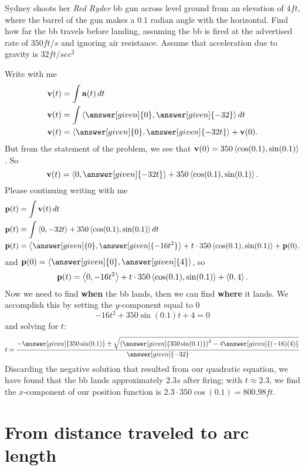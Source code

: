\documentclass{ximera}
\begin{document}
\begin{example}
Sydney shoots her \textit{Red Ryder} bb gun across level ground from
an elevation of $4\unit{ft}$, where the barrel of the gun makes a
$0.1$ radian angle with the horizontal. Find how far the bb travels
before landing, assuming the bb is fired at the advertised rate of
$350\unit{ft/s}$ and ignoring air resistance. Assume that acceleration
due to gravity is $32\unit{ft/sec^2}$
\begin{explanation}
  Write with me
  \begin{align*}
    \vec{v}(t) &= \int \vec{a}(t) \d t\\
    \vec{v}(t) &= \int \vector{\answer[given]{0},\answer[given]{-32}} \d t\\
    \vec{v}(t) &= \vector{\answer[given]{0},\answer[given]{-32t}} + \vec{v}(0).
  \end{align*}
  But from the statement of the problem, we see that $\mathbf{v}(0) =
  350\left\langle \cos(0.1),\sin(0.1)\right\rangle$. So
  \[
  \vec{v}(t) = \vector{0,\answer[given]{-32t}}+ 350\vector{\cos(0.1),\sin(0.1)}.
  \]
  Please continuing writing with me
  \begin{align*}
    \vec{p}(t) &= \int \vec{v}(t)\d t \\
    \vec{p}(t) &= \int \vector{0,-32t} + 350\vector{\cos(0.1),\sin(0.1)}\d t\\
    \vec{p}(t) &= \vector{\answer[given]{0},\answer[given]{-16t^2}} +t\cdot 350\vector{\cos(0.1),\sin(0.1)}+ \vec{p}(0).
  \end{align*}
  and $\vec{p}(0) = \vector{\answer[given]{0},\answer[given]{4}}$, so
  \[
  \mathbf{p}(t) = \left\langle 0,-16t^2\right\rangle +t\cdot 350\left\langle \cos(0.1),\sin(0.1)\right\rangle+ \left\langle 0,4\right\rangle.
  \]
  Now we need to find \textbf{when} the bb lands, then we can find
  \textbf{where} it lands. We accomplish this by setting the
  $y$-component equal to $0$ 
  \[
  -16t^2+350\sin(0.1)t+4 = 0
  \]
  and solving for $t$:
  \[
  t = \frac{-\answer[given]{350\sin(0.1)} \pm \sqrt{\left(\answer[given]{350\sin(0.1)}\right)^2-4\answer[given]{(-16)(4)}}}{\answer[given]{-32}}
  \]
Discarding the negative solution that resulted from our quadratic
equation, we have found that the bb lands approximately
$2.3\unit{s}$ after firing; with $t\approx 2.3$, we find the
$x$-component of our position function is $2.3\cdot 350\cos(0.1) =
  800.98\unit{ft}$. 
\end{explanation}
\end{example}


\section{From distance traveled to arc length}
\end{document}

